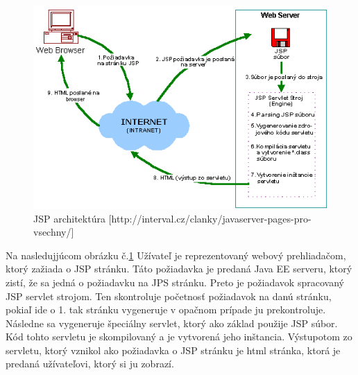 \begin{figure}[htb]

\begin{center}

\includegraphics[scale=0.5]{architecture.jpg} 
\caption{JSP architektúra [http://interval.cz/clanky/javaserver-pages-pro-vsechny/] }
\label{jsp}

\end{center}

\end{figure}
Na nasledujjúcom obrázku č.\ref{jsp}
Užívateľ je reprezentovaný webový prehliadačom, ktorý zažiada o JSP stránku. Táto požiadavka je predaná Java EE serveru, ktorý zistí, že sa jedná o požiadavku na JPS stránku. Preto je požiadavok spracovaný JSP servlet strojom. Ten skontroluje početnosť požiadavok na danú stránku, pokiaľ ide o 1. tak stránku vygeneruje v opačnom prípade ju prekontroluje. Následne sa vygeneruje špeciálny servlet, ktorý ako základ použije JSP súbor. Kód tohto servletu je skompilovaný a je vytvorená jeho inštancia. Výstupotom zo servletu, ktorý vznikol ako požiadavka o JSP stránku je html stránka, ktorá je predaná užívateľovi, ktorý si ju zobrazí. 


